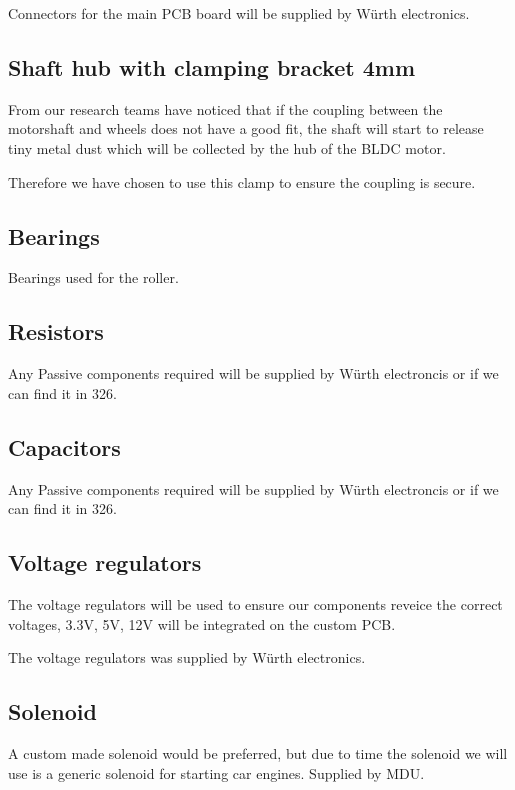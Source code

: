 \documentclass[a4paper,4pt]{article}
\begin{document}
  Connectors for the main PCB board will be supplied by Würth
  electronics.

  \subsection{Shaft hub with clamping bracket 4mm}

  From our research teams have noticed that if the coupling between the
  motorshaft and wheels does not have a good fit, the shaft will start
  to release tiny metal dust which will be collected by the hub of the
  BLDC motor.

  Therefore we have chosen to use this clamp to ensure the coupling is
  secure.

  \subsection{Bearings}

  Bearings used for the roller.

  \subsection{Resistors}

  Any Passive components required will be supplied by Würth electroncis
  or if we can find it in 326.

  \subsection{Capacitors}

  Any Passive components required will be supplied by Würth electroncis
  or if we can find it in 326.

  \subsection{Voltage regulators}

  The voltage regulators will be used to ensure our components reveice
  the correct voltages, 3.3V, 5V, 12V will be integrated on the custom
  PCB.

  The voltage regulators was supplied by Würth electronics.

  \subsection{Solenoid}

  A custom made solenoid would be preferred, but due to time the
  solenoid we will use is a generic solenoid for starting car engines.
  Supplied by MDU.
\end{document}
